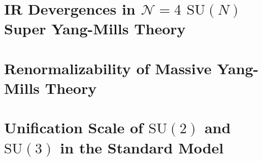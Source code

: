 \documentclass[12pt]{article}
\begin{document}

\section{IR Devergences in $\mathcal{N} = 4$ $\mathrm{SU}(N)$ Super Yang-Mills Theory}

\section{Renormalizability of Massive Yang-Mills Theory}

\section{Unification Scale of $\mathrm{SU}(2)$ and $\mathrm{SU}(3)$ in the Standard Model}
\end{document}
